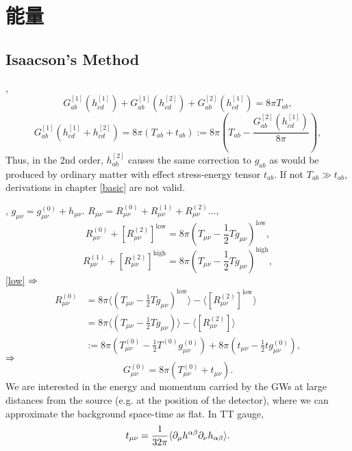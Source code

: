 \chapter{能量}

\section{Isaacson's Method}

\cite{Wald1984}, 
\begin{equation}
    G_{ab}^{[1]}(h_{cd}^{[1]})+G_{ab}^{[1]}(h_{cd}^{[2]})+G_{ab}^{[2]}(h_{cd}^{[1]})=8\pi T_{ab},
\end{equation}
\begin{equation}
    G_{ab}^{[1]}(h_{cd}^{[1]}+h_{cd}^{[2]})=8\pi (T_{ab}+t_{ab}):=8\pi (T_{ab}-\frac{G_{ab}^{[2]}(h_{cd}^{[1]})}{8\pi}),
\end{equation}
Thus, in the 2nd order, $h_{ab}^{[2]}$ causes the same correction to $g_{ab}$ as would be produced by ordinary matter with effect stress-energy tensor $t_{ab}$. If not $T_{ab}\gg t_{ab}$, derivations in chapter \ref{basic} are not valid.

\cite{Maggiore2014,Isaacson1968a}, $g_{\mu\nu}={g}_{\mu\nu}^{(0)}+h_{\mu\nu}$. $R_{\mu\nu}=R_{\mu\nu}^{(0)}+R_{\mu\nu}^{(1)}+R_{\mu\nu}^{(2)}\dots$,
\begin{equation}
    R_{\mu\nu}^{(0)}+[R_{\mu\nu}^{(2)}]^\text{low}=8\pi(T_{\mu\nu}-\frac{1}{2}Tg_{\mu\nu})^\text{low},\label{low}
\end{equation}
\begin{equation}
    R_{\mu\nu}^{(1)}+[R_{\mu\nu}^{(2)}]^\text{high}=8\pi(T_{\mu\nu}-\frac{1}{2}Tg_{\mu\nu})^\text{high},\label{high}
\end{equation}
\eqref{low} $\Rightarrow$
\begin{align}
    R_{\mu\nu}^{(0)}&=8\pi\langle (T_{\mu\nu}-\frac{1}{2}Tg_{\mu\nu})^\text{low}\rangle-\langle[R_{\mu\nu}^{(2)}]^\text{low}\rangle\\
    &=8\pi\langle (T_{\mu\nu}-\frac{1}{2}Tg_{\mu\nu})\rangle-\langle[R_{\mu\nu}^{(2)}]\rangle\\
    &:=8\pi({T}_{\mu\nu}^{(0)}-\frac{1}{2}{T}^{(0)}{g}_{\mu\nu}^{(0)})+8\pi(t_{\mu\nu}-\frac{1}{2}t{g}_{\mu\nu}^{(0)}),
\end{align}
$\Rightarrow$
\begin{equation}
    G_{\mu\nu}^{(0)}=8\pi({T}_{\mu\nu}^{(0)}+t_{\mu\nu}).
\end{equation}
We are interested in the energy and momentum carried by the GWs at large distances from the source (e.g.  at the position of the detector), where we can approximate the background space-time as flat. In TT gauge,
\begin{equation}
    t_{\mu\nu}=\frac{1}{32\pi}\langle\partial_\mu h^{\alpha\beta}\partial_\nu h_{\alpha\beta}\rangle.
\end{equation}
